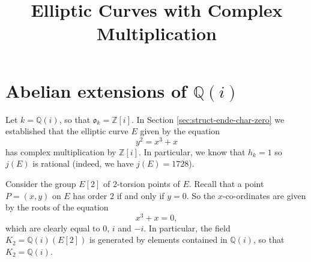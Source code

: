 \documentclass{article}
\title{Elliptic Curves with Complex Multiplication}
\theoremstyle{definition}
\begin{document}
\section{Abelian extensions of $\mathbb{Q}(i)$}
\label{sec:abel-extens-Qi}

Let $k = \mathbb{Q}(i)$, so that $\mathfrak{o}_{k} = \mathbb{Z}[i]$.  In Section
\ref{sec:struct-ende-char-zero} we established that the elliptic curve $E$ given by
the equation
\begin{equation*}
  y^{2} = x^{3} + x
\end{equation*}
has complex multiplication by $\mathbb{Z}[i]$.  In particular, we know that $h_{k} =
1$ so $j(E)$ is rational (indeed, we have $j(E) = 1728$).

Consider the group $E[2]$ of $2$-torsion points of $E$.  Recall that a point $P =
(x,y)$ on $E$ has order $2$ if and only if $y = 0$.  So the $x$-co-ordinates are
given by the roots of the equation
\begin{equation*}
  x^{3} + x = 0,
\end{equation*}
which are clearly equal to $0$, $i$ and $-i$.  In particular, the field $K_{2} =
\mathbb{Q}(i)(E[2])$ is generated by elements contained in $\mathbb{Q}(i)$, so that
$K_{2} = \mathbb{Q}(i)$.
\end{document}
